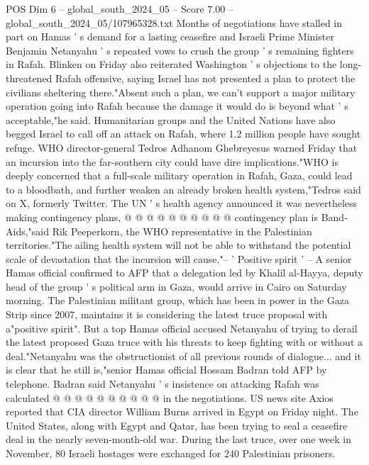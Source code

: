 \begin{textsample}{POS Dim 6 – global\_south\_2024\_05 – Score 7.00 – global\_south\_2024\_05/107965328.txt}  \label{ex:f6_pos_151}
Months of negotiations have stalled in part on Hamas ' s demand for a lasting ceasefire and Israeli Prime Minister Benjamin Netanyahu ' s repeated vows to crush the group ' s remaining fighters in Rafah.
Blinken on Friday also reiterated Washington ' s objections to the long-threatened Rafah offensive, saying Israel has not presented a plan to protect the civilians sheltering there."Absent such a plan, we can't support a major military operation going into Rafah because the damage it would do is beyond what ' s acceptable,"he said.
Humanitarian groups and the United Nations have also begged Israel to call off an attack on Rafah, where 1.2 million people have sought refuge.
WHO director-general Tedros Adhanom Ghebreyesus warned Friday that an incursion into the far-southern city could have dire implications."WHO is deeply concerned that a full-scale military operation in Rafah, Gaza, could lead to a bloodbath, and further weaken an already broken health system,"Tedros said on X, formerly Twitter.
The UN ' s health agency announced it was nevertheless making contingency plans, @ @ @ @ @ @ @ @ @ @ contingency plan is Band-Aids,"said Rik Peeperkorn, the WHO representative in the Palestinian territories."The ailing health system will not be able to withstand the potential scale of devastation that the incursion will cause."-- ' Positive spirit ' -- A senior Hamas official confirmed to AFP that a delegation led by Khalil al-Hayya, deputy head of the group ' s political arm in Gaza, would arrive in Cairo on Saturday morning.
The Palestinian militant group, which has been in power in the Gaza Strip since 2007, maintains it is considering the latest truce proposal with a"positive spirit".
But a top Hamas official accused Netanyahu of trying to derail the latest proposed Gaza truce with his threats to keep fighting with or without a deal."Netanyahu was the obstructionist of all previous rounds of dialogue... and it is clear that he still is,"senior Hamas official Hossam Badran told AFP by telephone.
Badran said Netanyahu ' s insistence on attacking Rafah was calculated @ @ @ @ @ @ @ @ @ @ in the negotiations.
US news site Axios reported that CIA director William Burns arrived in Egypt on Friday night.
The United States, along with Egypt and Qatar, has been trying to seal a ceasefire deal in the nearly seven-month-old war.
During the last truce, over one week in November, 80 Israeli hostages were exchanged for 240 Palestinian prisoners.

\end{textsample}
